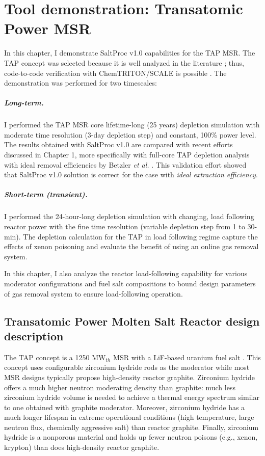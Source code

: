 \chapter{Tool demonstration: Transatomic Power MSR}

In this chapter, I demonstrate SaltProc v1.0 capabilities for the \gls{TAP} 
\gls{MSR}. The \gls{TAP} concept was selected because it is well analyzed in 
the literature \cite{betzler_two-dimensional_2017, betzler_assessment_2017-1};
thus, code-to-code verification with ChemTRITON/SCALE is possible 
\cite{betzler_assessment_2017-1}. The demonstration was performed for two 
timescales:
\paragraph*{Long-term.} I performed the \gls{TAP} \gls{MSR} core lifetime-long 
(25 years) depletion simulation with moderate time resolution (3-day depletion 
step) and constant, 100\% power level. The 
results obtained with SaltProc v1.0 are compared with recent efforts discussed 
in Chapter 1, more specifically with full-core \gls{TAP} depletion analysis 
with ideal removal efficiencies by Betzler \emph{et al.}  
\cite{betzler_assessment_2017-1}. This validation effort showed that SaltProc 
v1.0 solution is correct for the case with \emph{ideal extraction efficiency}.
\paragraph*{Short-term (transient).} I performed the 24-hour-long depletion 
simulation with changing, load following reactor power with the fine time 
resolution (variable depletion step from 1 to 30-min). The depletion 
calculation for the \gls{TAP} in load following regime capture the effects of 
xenon poisoning and evaluate the benefit of using an online gas removal system.

In this chapter, I also analyze the reactor load-following capability for 
various moderator configurations and fuel salt compositions to bound design 
parameters of gas removal system to ensure load-following operation. 

\section{Transatomic Power Molten Salt Reactor design description}

The \gls{TAP} concept is a 1250 MW$_{th}$ \gls{MSR} with a LiF-based uranium 
fuel salt \cite{transatomic_power_corporation_technical_2016}. This concept 
uses configurable zirconium hydride rods as the moderator while most \gls{MSR} 
designs typically propose high-density reactor graphite. Zirconium hydride 
offers a much higher neutron moderating density than graphite: much less 
zirconium hydride volume is needed to achieve a thermal energy spectrum 
similar to one obtained with graphite moderator. Moreover, zirconium hydride 
has a much longer lifespan in extreme operational conditions (high 
temperature, large neutron flux, chemically aggressive salt) than reactor 
graphite. Finally, zirconium hydride is a nonporous material and holds up 
fewer neutron poisons (e.g., xenon, krypton) than does high-density 
reactor graphite.

